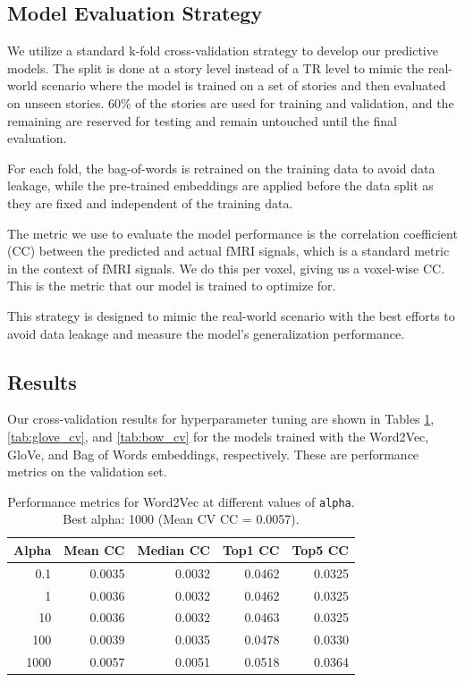 \documentclass[10pt,letterpaper]{article}
\begin{document}
\subsection{Model Evaluation Strategy}

We utilize a standard k-fold cross-validation strategy to develop our predictive models. The split is done at a story level instead of a TR level to mimic the real-world scenario where the model is trained on a set of stories and then evaluated on unseen stories. 60\% of the stories are used for training and validation, and the remaining are reserved for testing and remain untouched until the final evaluation.

For each fold, the bag-of-words is retrained on the training data to avoid data leakage, while the pre-trained embeddings are applied before the data split as they are fixed and independent of the training data.

The metric we use to evaluate the model performance is the correlation coefficient (CC) between the predicted and actual fMRI signals, which is a standard metric in the context of fMRI signals. We do this per voxel, giving us a voxel-wise CC. This is the metric that our model is trained to optimize for.

This strategy is designed to mimic the real-world scenario with the best efforts to avoid data leakage and measure the model's generalization performance.

\subsection{Results}

Our cross-validation results for hyperparameter tuning are shown in Tables \ref{tab:word2vec_cv}, \ref{tab:glove_cv}, and \ref{tab:bow_cv} for the models trained with the Word2Vec, GloVe, and Bag of Words embeddings, respectively. These are performance metrics on the validation set.


\begin{table}[ht]
\centering
\caption{Performance metrics for Word2Vec at different values of \texttt{alpha}. Best alpha: 1000 (Mean CV CC = 0.0057).}
\label{tab:word2vec_cv}
\begin{tabular}{rrrrr}
\toprule
\textbf{Alpha} & \textbf{Mean CC} & \textbf{Median CC} & \textbf{Top1 CC} & \textbf{Top5 CC} \\
\midrule
0.1    & 0.0035 & 0.0032 & 0.0462 & 0.0325 \\
1      & 0.0036 & 0.0032 & 0.0462 & 0.0325 \\
10     & 0.0036 & 0.0032 & 0.0463 & 0.0325 \\
100    & 0.0039 & 0.0035 & 0.0478 & 0.0330 \\
1000   & 0.0057 & 0.0051 & 0.0518 & 0.0364 \\
\bottomrule
\end{tabular}
\end{table}
\end{document}
